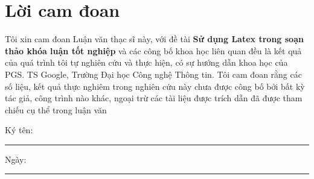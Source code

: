 \chapter*{\centering\Large{Lời cam đoan}}

Tôi xin cam đoan Luận văn thạc sĩ này, với đề tài \textbf{Sử dụng Latex trong soạn thảo khóa luận tốt nghiệp} và các công bố khoa học liên quan đều là kết quả của quá trình tôi tự nghiên cứu và thực hiện, có sự hướng dẫn khoa học của PGS. TS Google, Trường Đại học Công nghệ Thông tin. Tôi cam đoan rằng các số liệu, kết quả thực nghiêm trong nghiên cứu này chưa được công bố bởi bất kỳ tác giả, công trình nào khác, ngoại trừ các tài liệu được trích dẫn đã được tham chiếu cụ thể trong luận văn

\vspace{10pt}
Ký tên:
\par\indent\rule{0.5\textwidth}{0.4pt}    

Ngày:
\par\indent\rule{0.5\textwidth}{0.4pt}  